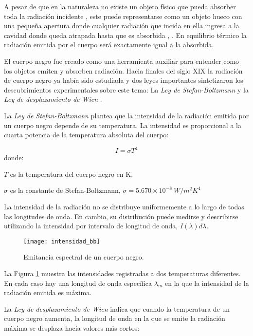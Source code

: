     A pesar de que en la naturaleza no existe un objeto físico que pueda absorber toda la radiación incidente \cite{FUV3}, este puede representarse como un objeto hueco con una pequeña apertura donde cualquier radiación que incida en ella ingresa a la cavidad donde queda atrapada hasta que es absorbida \cite{Beiser}, \cite{FUV3}. En equilibrio térmico la radiación emitida por el cuerpo será exactamente igual a la absorbida.
    
    El cuerpo negro fue creado como una herramienta auxiliar para entender como los objetos emiten y absorben radiación.
    Hacia finales del siglo XIX la radiación de cuerpo negro ya había sido estudiada y dos leyes importantes sintetizaron los descubrimientos experimentales sobre este tema: La \textit{Ley de Stefan-Boltzmann} y la \textit{Ley de desplazamiento de Wien} \cite{FUV3}.
    
    La \textit{Ley de Stefan-Boltzmann} plantea que la intensidad de la radiación emitida por un cuerpo negro depende de su temperatura. La intensidad es proporcional a la cuarta potencia de la temperatura absoluta del cuerpo:
    
    \begin{equation}
        I = \sigma T^{4}
        \label{eq:Stefan-Boltzmann}
    \end{equation}
    donde:
    
    $T$ es la temperatura del cuerpo negro en K.
    
    $\sigma$ es la constante de Stefan-Boltzmann, $\sigma = 5.670\times10^{-8}\ W/m^{2}K^{4}$
    
    La intensidad de la radiación no se distribuye uniformemente a lo largo de todas las longitudes de onda. En cambio, su distribución puede medirse y describirse utilizando la intensidad por intervalo de longitud de onda, $I(\lambda)d\lambda$.
            \begin{figure}[hbtp]
                \centering
                \texttt{[image: intensidad\_bb]}
                \caption{Emitancia espectral de un cuerpo negro.}
                \label{fig:intensidad_bb}
            \end{figure}    
    La Figura \ref{fig:intensidad_bb} muestra las intensidades registradas a dos temperaturas diferentes. En cada caso hay una longitud de onda específica $\lambda_{m}$ en la que la intensidad de la radiación emitida es máxima.
    
    La \textit{Ley de desplazamiento de Wien} indica que cuando la temperatura de un cuerpo negro aumenta, la longitud de onda en la que se emite la radiación máxima se desplaza hacia valores más cortos:
    
